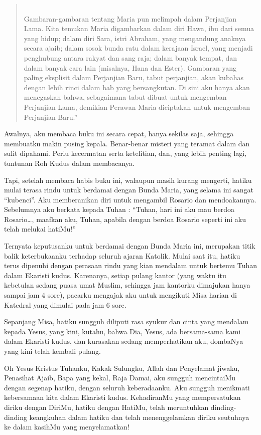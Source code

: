\begin{quote}
{{~}\\
Gambaran-gambaran tentang Maria pun melimpah dalam Perjanjian Lama. Kita temukan Maria digambarkan dalam diri Hawa, ibu dari semua yang hidup; dalam diri Sara, istri Abraham, yang mengandung anaknya secara ajaib; dalam sosok bunda ratu dalam kerajaan Israel, yang menjadi penghubung antara rakyat dan sang raja; dalam banyak tempat, dan dalam banyak cara lain (misalnya, Hana dan Ester). Gambaran yang paling eksplisit dalam Perjanjian Baru, tabut perjanjian, akan kubahas dengan lebih rinci dalam bab yang bersangkutan. Di sini aku hanya akan menegaskan bahwa, sebagaimana tabut dibuat untuk mengemban Perjanjian Lama, demikian Perawan Maria diciptakan untuk mengemban Perjanjian Baru.”}
\end{quote}

Awalnya, aku membaca buku ini secara cepat, hanya sekilas saja, sehingga membuatku makin pusing kepala. Benar-benar misteri yang teramat dalam dan sulit dipahami. Perlu kecermatan serta ketelitian, dan, yang lebih penting lagi, tuntunan Roh Kudus dalam membacanya.

Tapi, setelah membaca habis buku ini, walaupun masih kurang mengerti, hatiku mulai terasa rindu untuk berdamai dengan Bunda Maria, yang selama ini sangat “kubenci”. Aku memberanikan diri untuk mengambil Rosario dan mendoakannya. Sebelumnya aku berkata kepada Tuhan :
“Tuhan, hari ini aku mau berdoa Rosario…, maafkan aku, Tuhan, apabila dengan berdoa Rosario seperti ini aku telah melukai hatiMu!”

Ternyata keputusanku untuk berdamai dengan Bunda Maria ini, merupakan titik balik keterbukaanku terhadap seluruh ajaran Katolik. Mulai saat itu, hatiku terus dipenuhi dengan perasaan rindu yang kian mendalam untuk bertemu Tuhan dalam Ekaristi kudus. Karenanya, setiap pulang kantor (yang waktu itu kebetulan sedang puasa umat Muslim, sehingga jam kantorku dimajukan hanya sampai jam 4 sore), pacarku mengajak aku untuk mengikuti Misa harian di Katedral yang dimulai pada jam 6 sore.

Sepanjang Misa, hatiku sungguh diliputi rasa syukur dan cinta yang mendalam kepada Yesus, yang kini, kutahu, bahwa Dia, Yesus, ada bersama-sama kami dalam Ekaristi kudus, dan kurasakan sedang memperhatikan aku, dombaNya yang kini telah kembali pulang.

Oh Yesus Kristus Tuhanku, Kakak Sulungku, Allah dan Penyelamat jiwaku, Penasihat Ajaib, Bapa yang kekal, Raja Damai, aku sungguh mencintaiMu dengan segenap hatiku, dengan seluruh keberadaanku. Aku sungguh menikmati kebersamaan kita dalam Ekaristi kudus. KehadiranMu yang mempersatukan diriku dengan DiriMu, hatiku dengan HatiMu, telah meruntuhkan dinding-dinding keangkuhan dalam hatiku dan telah menenggelamkan diriku seutuhnya ke dalam kasihMu yang menyelamatkan!

